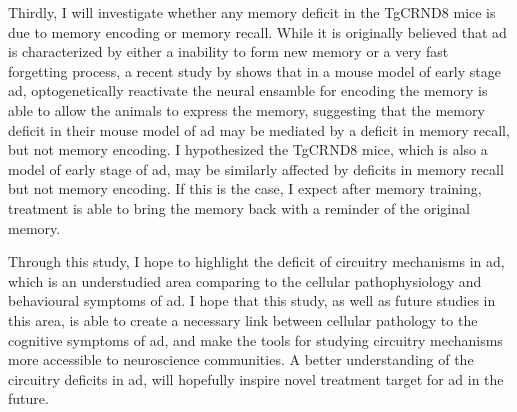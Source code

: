 Thirdly, I will investigate whether any memory deficit in the TgCRND8 mice is due to memory encoding or memory recall. While it is originally believed that \gls{ad} is characterized by either a inability to form new memory or a very fast forgetting process, a recent study by \citet{roy16} shows that in a mouse model of early stage \gls{ad}, optogenetically reactivate the neural ensamble for encoding the memory is able to allow the animals to express the memory, suggesting that the memory deficit in their mouse model of \gls{ad} may be mediated by a deficit in memory recall, but not memory encoding. I hypothesized the TgCRND8 mice, which is also a model of early stage of \gls{ad}, may be similarly affected by deficits in memory recall but not memory encoding. If this is the case, I expect after memory training, \tglu treatment is able to bring the memory back with a reminder of the original memory.

Through this study, I hope to highlight the deficit of circuitry mechanisms in \gls{ad}, which is an understudied area comparing to the cellular pathophysiology and behavioural symptoms of \gls{ad}. I hope that this study, as well as future studies in this area, is able to create a necessary link between cellular pathology to the cognitive symptoms of \gls{ad}, and make the tools for studying circuitry mechanisms more accessible to neuroscience communities. A better understanding of the circuitry deficits in \gls{ad}, will hopefully inspire novel treatment target for \gls{ad} in the future. 
